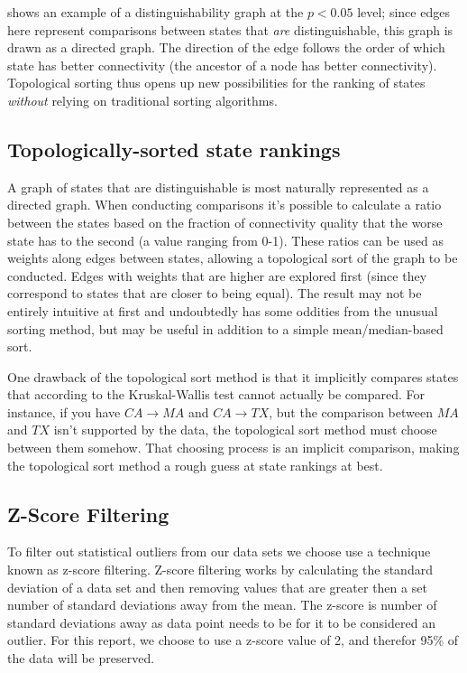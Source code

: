  shows an example of a distinguishability graph at the $p<0.05$ level; since edges here represent comparisons between states that \textit{are} distinguishable, this graph is drawn as a directed graph. The direction of the edge follows the order of which state has better connectivity (the ancestor of a node has better connectivity). Topological sorting thus opens up new possibilities for the ranking of states \textit{without} relying on traditional sorting algorithms.

\subsection{Topologically-sorted state rankings}\label{sec:methods_stats_topological_rankings}

A graph of states that are distinguishable is most naturally represented as a directed graph. When conducting comparisons it's possible to calculate a ratio between the states based on the fraction of connectivity quality that the worse state has to the second (a value ranging from 0-1). These ratios can be used as weights along edges between states, allowing a topological sort of the graph to be conducted. Edges with weights that are higher are explored first (since they correspond to states that are closer to being equal). The result may not be entirely intuitive at first and undoubtedly has some oddities from the unusual sorting method, but may be useful in addition to a simple mean/median-based sort.

One drawback of the topological sort method is that it implicitly compares states that according to the Kruskal-Wallis test cannot actually be compared. For instance, if you have $CA\rightarrow MA$ and $CA\rightarrow TX$, but the comparison between $MA$ and $TX$ isn't supported by the data, the topological sort method must choose between them somehow. That choosing process is an implicit comparison, making the topological sort method a rough guess at state rankings at best.

\subsection{Z-Score Filtering} \label{sec:z-score-filtering}

To filter out statistical outliers from our data sets we choose use a technique known as z-score filtering. Z-score filtering works by calculating the standard deviation of a data set and then removing values that are greater then a set number of standard deviations away from the mean. The z-score is number of standard deviations away as data point needs to be for it to be considered an outlier. For this report, we choose to use a z-score value of 2, and therefor 95\% of the data will be preserved.
